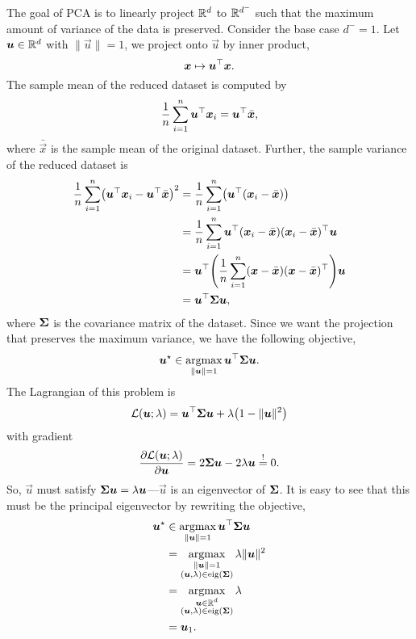 The goal of PCA is to linearly project $\mathbb{R}^d$ to $\mathbb{R}^{d^-}$ such that the maximum amount of
variance of the data is preserved.
Consider the base case $d^- = 1$. Let $\bm{u} \in \mathbb{R}^d$ with $\| \vec{u} \| = 1$, we project onto
$\vec{u}$ by inner product, \[
    \bm{x} \mapsto \bm{u}^\top \bm{x}.
\]
The sample mean of the reduced dataset is computed by \[
    \frac{1}{n} \sum_{i=1}^{n} \bm{u}^\top \bm{x}_i = \bm{u}^\top \bar{\bm{x}},
\]
where $\bar{\vec{x}}$ is the sample mean of the original dataset. Further, the sample variance of
the reduced dataset is
\begin{align*}
    \frac{1}{n} \sum_{i=1}^{n} \lft( \transpose{\vec{u}} \vec{x}_i - \transpose{\vec{u}} \bar{\vec{x}} \rgt)^2 & = \frac{1}{n} \sum_{i=1}^{n} \lft( \transpose{\vec{u}} (\vec{x}_i - \bar{\vec{x}}) \rgt)                                             \\
                                                                                                               & = \frac{1}{n} \sum_{i=1}^{n} \transpose{\vec{u}} (\vec{x}_i - \bar{\vec{x}}) \transpose{(\vec{x}_i - \bar{\vec{x}})} \vec{u}         \\
                                                                                                               & = \transpose{\vec{u}} \lft( \frac{1}{n} \sum_{i=1}^{n} (\vec{x} - \bar{\vec{x}}) \transpose{(\vec{x} - \bar{\vec{x}})} \rgt) \vec{u} \\
                                                                                                               & = \transpose{\vec{u}} \mat{\Sigma} \vec{u},
\end{align*}
where $\bm{\Sigma}$ is the covariance matrix of the dataset. Since we want the projection that preserves the maximum variance, we have the following objective, \[
    \bm{u}^\star \in \operatorname*{argmax}_{\| \bm{u} \| = 1} \bm{u}^\top \bm{\Sigma} \bm{u}.
\]
The Lagrangian of this problem is \[
    \mathcal{L}(\vec{u}; \lambda) = \transpose{\vec{u}} \mat{\Sigma} \vec{u} + \lambda \lft( 1 - \| \vec{u} \|^2 \rgt)
\]
with gradient \[
    \pdv{\mathcal{L}(\bm{u}; \lambda)}{\bm{u}} = 2 \bm{\Sigma} \bm{u} - 2 \lambda \bm{u} \overset{!}{=} 0.
\]
So, $\vec{u}$ must satisfy $\bm{\Sigma} \bm{u} = \lambda \bm{u}$---$\vec{u}$ is an eigenvector
of $\bm{\Sigma}$. It is easy to see that this must be the principal eigenvector by rewriting the
objective,
\begin{align*}
    \bm{u}^\star & \in \operatorname*{argmax}_{\| \bm{u} \| = 1} \bm{u}^\top \bm{\Sigma} \bm{u} \\
                  & = \operatorname*{argmax}_{\substack{\| \bm{u} \| = 1                                   \\ (\bm{u}, \lambda) \in \mathrm{eig}(\bm{\Sigma})}} \lambda \| \bm{u} \|^2                    \\
                  & = \operatorname*{argmax}_{\substack{\bm{u} \in \mathbb{R}^d                                    \\ (\bm{u}, \lambda) \in \mathrm{eig}(\bm{\Sigma})}} \lambda                                    \\
                  & = \bm{u}_1.
\end{align*}
